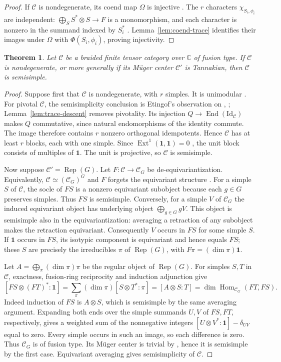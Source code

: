 \documentclass[11pt,reqno]{amsart}
\newtheorem{theorem}{Theorem}[section]
\theoremstyle{definition}
\newcommand{\Hom}{\operatorname{Hom}}
\newcommand{\End}{\operatorname{End}}
\newcommand{\Ext}{\operatorname{Ext}}
\newcommand{\one}{\mathbf 1}
\newcommand{\C}{\mathcal C}
\newcommand{\CC}{\mathbb C}
\newcommand{\Rep}{\operatorname{Rep}}
\begin{document}
\begin{proof}
If $\C$ is nondegenerate, its coend map $\Omega$ is injective \cite[Theorem~1.1]{Shimizu}. The $r$ characters $\chi_{S_i,\phi_i}$ are independent: $\bigoplus_SS^*\otimes S\to F$ is a monomorphism, and each character is nonzero in the summand indexed by $S_i^*$ \cite[Lemma~5.5 and the proof of Lemma~5.6]{Shimizu}. Lemma~\ref{lem:coend-trace} identifies their images under $\Omega$ with $\Phi(S_i,\phi_i)$, proving injectivity.
\end{proof}

\begin{theorem}\label{thm:nondegenerate}
Let $\C$ be a braided finite tensor category over $\CC$ of fusion type. If $\C$ is nondegenerate, or more generally if its M\"uger center $\C'$ is Tannakian, then $\C$ is semisimple.
\end{theorem}
\begin{proof}
Suppose first that $\C$ is nondegenerate, with $r$ simples. It is unimodular \cite[Proposition~8.10.10]{EGNO}. For pivotal $\C$, the semisimplicity conclusion is Etingof's observation on \cite[Corollary~8.7]{GR}, \cite{MOEtingof}; Lemma~\ref{lem:trace-descent} removes pivotality. Its injection $Q\to\End(\mathrm{Id}_\C)$ makes $Q$ commutative, since natural endomorphisms of the identity commute. The image therefore contains $r$ nonzero orthogonal idempotents. Hence $\C$ has at least $r$ blocks, each with one simple. Since $\Ext^1(\one,\one)=0$ \cite[Theorem~4.4.1]{EGNO}, the unit block consists of multiples of $\one$. The unit is projective, so $\C$ is semisimple.

Now suppose $\C'=\Rep(G)$. Let $F:\C\to\C_G$ be de-equivariantization. Equivalently, $\C\simeq(\C_G)^G$ and $F$ forgets the equivariant structure \cite[\S4.3]{NP}. For a simple $S$ of $\C$, the socle of $FS$ is a nonzero equivariant subobject because each $g\in G$ preserves simples. Thus $FS$ is semisimple. Conversely, for a simple $V$ of $\C_G$ the induced equivariant object has underlying object $\bigoplus_{g\in G}gV$. This object is semisimple also in the equivariantization: averaging a retraction of any subobject makes the retraction equivariant. Consequently $V$ occurs in $FS$ for some simple $S$. If $\one$ occurs in $FS$, its isotypic component is equivariant and hence equals $FS$; these $S$ are precisely the irreducibles $\pi$ of $\Rep(G)$, with $F\pi=(\dim\pi)\one$.

Let $A=\bigoplus_\pi(\dim\pi)\pi$ be the regular object of $\Rep(G)$. For simples $S,T$ in $\C$, exactness, fusion-ring reciprocity and induction adjunction give
\[
 [FS\otimes(FT)^*:\one]
 =\sum_\pi(\dim\pi)[S\otimes T^*:\pi]
 =[A\otimes S:T]=\dim\Hom_{\C_G}(FT,FS).
\]
Indeed induction of $FS$ is $A\otimes S$, which is semisimple by the same averaging argument. Expanding both ends over the simple summands $U,V$ of $FS,FT$, respectively, gives a weighted sum of the nonnegative integers $[U\otimes V^*:\one]-\delta_{UV}$ equal to zero. Every simple occurs in such an image, so each difference is zero. Thus $\C_G$ is of fusion type. Its M\"uger center is trivial by \cite[Theorem~7.5]{NP}, hence it is semisimple by the first case. Equivariant averaging gives semisimplicity of $\C$.
\end{proof}
\end{document}
